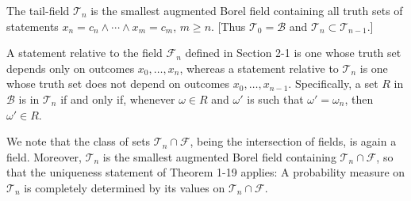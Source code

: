 The tail-field $\mathcal{T}_n$ is the smallest augmented Borel field containing all truth sets of statements $x_n = c_n \wedge \cdots \wedge x_m = c_m$, $m \geq n$. [Thus $\mathcal{T}_0 = \mathcal{B}$ and $\mathcal{T}_n \subset \mathcal{T}_{n-1}$.]

A statement relative to the field $\mathcal{F}_n$ defined in Section 2-1 is one whose truth set depends only on outcomes $x_0, \ldots, x_n$, whereas a statement relative to $\mathcal{T}_n$ is one whose truth set does not depend on outcomes $x_0, \ldots, x_{n-1}$. Specifically, a set $R$ in $\mathcal{B}$ is in $\mathcal{T}_n$ if and only if, whenever $\omega \in R$ and $\omega'$ is such that $\omega' = \omega_n$, then $\omega' \in R$.

We note that the class of sets $\mathcal{T}_n \cap \mathcal{F}$, being the intersection of fields, is again a field. Moreover, $\mathcal{T}_n$ is the smallest augmented Borel field containing $\mathcal{T}_n \cap \mathcal{F}$, so that the uniqueness statement of Theorem 1-19 applies: A probability measure on $\mathcal{T}_n$ is completely determined by its values on $\mathcal{T}_n \cap \mathcal{F}$.
